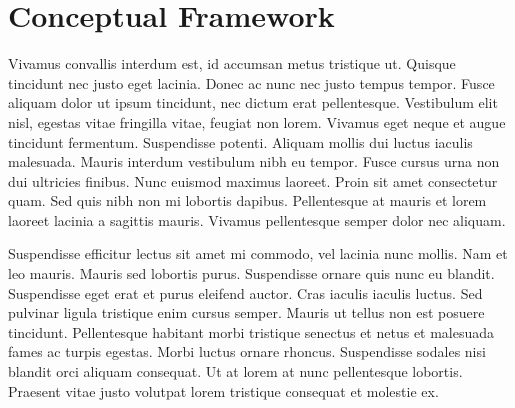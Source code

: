 \section{Conceptual Framework}
\label{sec:2}






Vivamus convallis interdum est, id accumsan metus tristique ut. Quisque tincidunt nec justo eget lacinia. Donec ac nunc nec justo tempus tempor. Fusce aliquam dolor ut ipsum tincidunt, nec dictum erat pellentesque. Vestibulum elit nisl, egestas vitae fringilla vitae, feugiat non lorem. Vivamus eget neque et augue tincidunt fermentum. Suspendisse potenti. Aliquam mollis dui luctus iaculis malesuada. Mauris interdum vestibulum nibh eu tempor. Fusce cursus urna non dui ultricies finibus. Nunc euismod maximus laoreet. Proin sit amet consectetur quam. Sed quis nibh non mi lobortis dapibus. Pellentesque at mauris et lorem laoreet lacinia a sagittis mauris. Vivamus pellentesque semper dolor nec aliquam.

Suspendisse efficitur lectus sit amet mi commodo, vel lacinia nunc mollis. Nam et leo mauris. Mauris sed lobortis purus. Suspendisse ornare quis nunc eu blandit. Suspendisse eget erat et purus eleifend auctor. Cras iaculis iaculis luctus. Sed pulvinar ligula tristique enim cursus semper. Mauris ut tellus non est posuere tincidunt. Pellentesque habitant morbi tristique senectus et netus et malesuada fames ac turpis egestas. Morbi luctus ornare rhoncus. Suspendisse sodales nisi blandit orci aliquam consequat. Ut at lorem at nunc pellentesque lobortis. Praesent vitae justo volutpat lorem tristique consequat et molestie ex.

